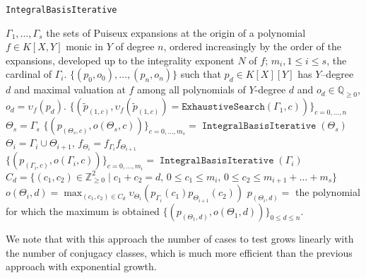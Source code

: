 \documentclass[a4paper,11pt]{amsart}%
\theoremstyle{definition}
\theoremstyle{plain}
\theoremstyle{remark}
\DeclareMathOperator{\IntegralBasisIterative}{\mathtt{IntegralBasisIterative}}
\newcommand{\Q}{{\mathbb Q}}
\newcommand{\Z}{{\mathbb Z}}
\newcommand{\vardbtilde}[1]{\tilde{\raisebox{0pt}[0.85\height]{$\tilde{#1}$}}}
\begin{document}


\begin{algorithm}[h]                      %
\caption{\texttt{IntegralBasisIterative}}          %
\label{algo:iterative}
\begin{algorithmic}[1]
\REQUIRE $\Gamma_1, \dots, \Gamma_s$ the sets of Puiseux expansions at the origin of a polynomial $f \in K[X,Y]$ monic in $Y$ of degree $n$, ordered increasingly by the order of the expansions, developed up to the integrality exponent $N$ of $f$; $m_i, 1 \le i \le s$, the cardinal of $\Gamma_i$.
\ENSURE $\{(p_0, o_0), \dots, (p_{n}, o_{n})\}$ such that $p_d \in K[X][Y]$ has $Y$--degree $d$ and
maximal valuation at $f$ among all polynomials of $Y$-degree $d$ and $o_d \in \Q_{\geq 0}$, $o_d = \upsilon_f(p_d)$.
\RETURN $\{(\tilde p_{(1, c)}, \upsilon_{f}(\tilde p_{(1, c)}) = \texttt{ExhaustiveSearch}(\Gamma_1, c))\}_{c= 0, \dots, n}$ %
\ELSE
\STATE $\Theta_s = \Gamma_s$
\STATE $\{(p_{(\Theta_s,c)}, o(\Theta_s, c))\}_{c = 0, \dots, m_s} = \IntegralBasisIterative(\Theta_s)$
\STATE $\Theta_i = \Gamma_i \cup \Theta_{i+1}$, $f_{\Theta_i} = f_{\Gamma_i} f_{\Theta_{i+1}}$
\STATE $\{(p_{(\Gamma_i,c)}, o(\Gamma_i, c))\}_{c = 0, \dots, m_i} = \IntegralBasisIterative(\Gamma_i)$
\STATE $C_d = \{(c_1, c_2) \in \Z_{\ge 0}^2 \mid c_1 + c_2 = d\mbox{, }0 \leq c_1 \leq m_i\mbox{, }0 \leq c_2 \leq m_{i+1} + \dots + m_s\}$
\STATE $o(\Theta_{i}, d) = \max_{(c_1, c_2) \in C_d} \upsilon_{{\Theta_{i}}%
}(p_{\Gamma_{i}}(c_{1})p_{\Theta_{i+1}}(c_{2}))$
\STATE $p_{(\Theta_i,d)} = $ the polynomial for which the maximum is obtained
\ENDFOR
\ENDFOR
\RETURN $\{(p_{(\Theta_1,d)}, o(\Theta_1, d))\}_{0 \le d \le n}$.
\ENDIF
\end{algorithmic}
\end{algorithm}

We note that with this approach the number of cases to test grows linearly with the number of conjugacy classes, which is much more efficient than the previous approach with exponential growth.
\end{document}
